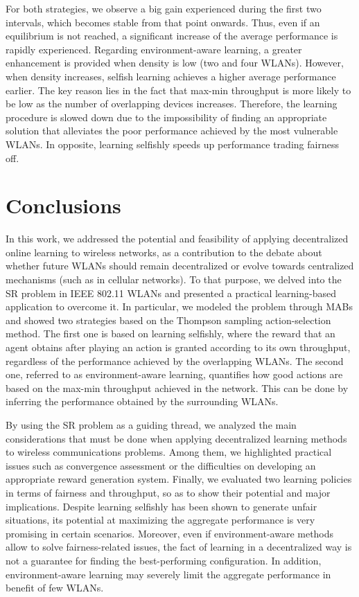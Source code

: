 \documentclass[preprint,12pt]{elsarticle}
\begin{document}
For both strategies, we observe a big gain experienced during the first two intervals, which becomes stable from that point onwards. Thus, even if an equilibrium is not reached, a significant increase of the average performance is rapidly experienced. Regarding environment-aware learning, a greater enhancement is provided when density is low (two and four WLANs). However, when density increases, selfish learning achieves a higher average performance earlier. The key reason lies in the fact that max-min throughput is more likely to be low as the number of overlapping devices increases. Therefore, the learning procedure is slowed down due to the impossibility of finding an appropriate solution that alleviates the poor performance achieved by the most vulnerable WLANs. In opposite, learning selfishly speeds up performance trading fairness off.

\section{Conclusions}
\label{section:conclusions}		
In this work, we addressed the potential and feasibility of applying decentralized online learning to wireless networks, as a contribution to the debate about whether future WLANs should remain decentralized or evolve towards centralized mechanisms (such as in cellular networks). To that purpose, we delved into the SR problem in IEEE 802.11 WLANs and presented a practical learning-based application to overcome it. In particular, we modeled the problem through MABs and showed two strategies based on the Thompson sampling action-selection method. The first one is based on learning selfishly, where the reward that an agent obtains after playing an action is granted according to its own throughput, regardless of the performance achieved by the overlapping WLANs. The second one, referred to as environment-aware learning, quantifies how good actions are based on the max-min throughput achieved in the network. This can be done by inferring the performance obtained by the surrounding WLANs. 

By using the SR problem as a guiding thread, we analyzed the main considerations that must be done when applying decentralized learning methods to wireless communications problems. Among them, we highlighted practical issues such as convergence assessment or the difficulties on developing an appropriate reward generation system. Finally, we evaluated two learning policies in terms of fairness and throughput, so as to show their potential and major implications. Despite learning selfishly has been shown to generate unfair situations, its potential at maximizing the aggregate performance is very promising in certain scenarios. Moreover, even if environment-aware methods allow to solve fairness-related issues, the fact of learning in a decentralized way is not a guarantee for finding the best-performing configuration. In addition, environment-aware learning may severely limit the aggregate performance in benefit of few WLANs. 
\end{document}
